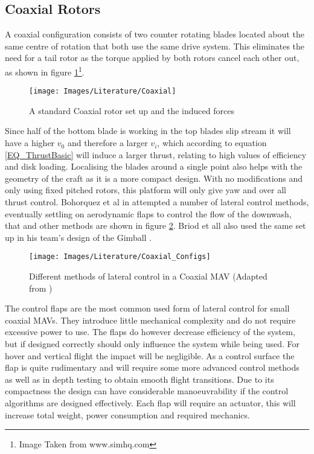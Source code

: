 \subsection{Coaxial Rotors}
A coaxial configuration consists of two counter rotating blades located about the same centre of rotation that both use the same drive system. This eliminates the need for a tail rotor as the torque applied by both rotors cancel each other out, as shown in figure \ref{IM_Coaxial}\footnote{Image Taken from www.simhq.com}.  

\begin{figure}[H]
\centering
\texttt{[image: Images/Literature/Coaxial]}     
\caption{A standard Coaxial rotor set up and the induced forces}
\label{IM_Coaxial}
\end{figure}

Since half of the bottom blade is working in the top blades slip stream it will have a higher $v_0$ and therefore a larger $v_i$, which according to equation \eqref{EQ_ThrustBasic} will induce a larger thrust, relating to high values of efficiency and disk loading. Localising the blades around a single point also helps with the geometry of the craft as it is a more compact design. With no modifications and only using fixed pitched rotors, this platform will only give yaw and over all thrust control. Bohorquez et al in \cite{Bohorquez} attempted a number of lateral control methods, eventually settling on aerodynamic flaps to control the flow of the downwash, that and other methods are shown in figure \ref{IM_Coaxial_Variations}. Briod et all also used the same set up in his team's design of the Gimball \cite{Briod2012}.
 
\begin{figure}[H]
	\centering
	\texttt{[image: Images/Literature/Coaxial\_Configs]}     
	\caption{Different methods of lateral control in a Coaxial MAV (Adapted from \cite{Bohorquez})}
	\label{IM_Coaxial_Variations}
\end{figure}

The control flaps are the most common used form of lateral control for small coaxial MAVs. They introduce little mechanical complexity and do not require excessive power to use. The flaps do however decrease efficiency of the system, but if designed correctly should only influence the system while being used. For hover and vertical flight the impact will be negligible. As a control surface the flap is quite rudimentary and will require some more advanced control methods as well as in depth testing to obtain smooth flight transitions. Due to its compactness the design can have considerable manoeuvrability if the control algorithms are designed effectively. Each flap will require an actuator, this will increase total weight, power consumption and required mechanics. 


